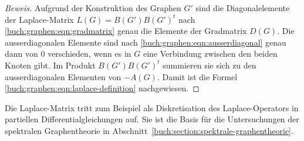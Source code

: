 \begin{proof}[Beweis]
Aufgrund der Konstruktion des Graphen $G'$ sind die Diagonalelemente
der Laplace-Matrix
$L(G)=B(G')B(G')^t$ nach \eqref{buch:graphen:eqn:gradmatrix} genau
die Elemente der Gradmatrix $D(G)$.
Die ausserdiagonalen Elemente sind nach
\eqref{buch:graphen:eqn:ausserdiagonal}
genau dann von $0$ verschieden, wenn es in $G$ eine Verbindung zwischen
den beiden Knoten gibt.
Im Produkt $B(G')B(G')^t$ summieren sie sich zu den ausserdiagonalen
Elementen von $-A(G)$.
Damit ist die Formel
\eqref{buch:graphen:eqn:laplace-definition}
nachgewiesen.
\end{proof}

Die Laplace-Matrix tritt zum Beispiel als Diskretisation des Laplace-Operators
in partiellen Differentialgleichungen auf.
Sie ist die Basis für die Untersuchungen der spektralen Graphentheorie
in Abschnitt~\ref{buch:section:spektrale-graphentheorie}.

